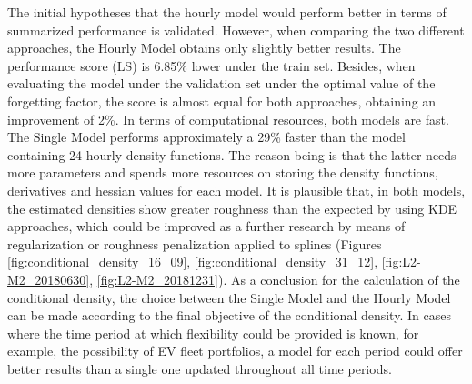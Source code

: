 The initial hypotheses that the hourly model would perform better in terms of summarized performance is validated. However, when comparing the two different approaches, the Hourly Model obtains only slightly better results. The performance score (LS) is 6.85\% lower under the train set. Besides, when evaluating the model under the validation set under the optimal value of the forgetting factor, the score is almost equal for both approaches, obtaining an improvement of 2\%. In terms of computational resources, both models are fast. The Single Model performs approximately a 29\% faster than the model containing 24 hourly density functions. The reason being is that the latter needs more parameters and spends more resources on storing the density functions, derivatives and hessian values for each model.  It is plausible that, in both models, the estimated densities show greater roughness than the expected by using KDE approaches, which could be improved as a further research by means of regularization or roughness penalization applied to splines (Figures \ref{fig:conditional_density_16_09}, \ref{fig:conditional_density_31_12}, \ref{fig:L2-M2_20180630}, \ref{fig:L2-M2_20181231}).
As a conclusion for the calculation of the conditional density, the choice between the Single Model and the Hourly Model can be made according to the final objective of the conditional density. In cases where the time period at which flexibility could be provided is known, for example, the possibility of EV fleet portfolios, a model for each period could offer better results than a single one updated throughout all time periods. 

\begin{table}[]
\centering
\caption{Results overview between the two models developed under level~2 of the hierarchical model for conditional flexibility estimation.}
\label{tab:level2-scores}
\end{table}

